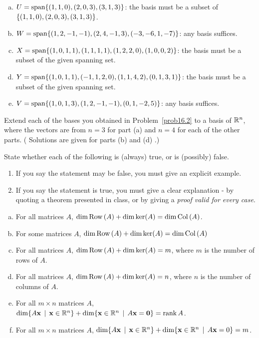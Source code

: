 \begin{prob}
\begin{enumerate}[a)]
\item $U=\textrm{span}\{(1,1,0), (2,0,3), (3,1,3)\}$: the basis must be a subset of $\{(1,1,0), (2,0,3), (3,1,3) \}$.
 
%
\medskip
\item\sov $W=\textrm{span}\{(1,2,-1,-1),(2,4,-1,3),(-3,-6,1,-7)\}$: any basis suffices.
\medskip
%
\item $X=\textrm{span}\{(1,0,1,1),(1,1,1,1),(1,2,2,0),(1,0,0,2) \}$: the basis must be a subset of the given spanning set.
\medskip
% 
\item\sov $Y=\textrm{span}\{(1,0,1,1), (-1,1,2,0), (1,1,4,2), (0,1,3,1)\}$: the basis must be a subset of the given spanning set.
\medskip
%
\item $V=\textrm{span}\{(1,0,1,3),(1,2,-1,-1),( 0,1,-2,5)\}$: any basis suffices.
\medskip
%
\end{enumerate}

\end{prob} \begin{prob} \label{prob16.3} Extend each of the bases you obtained in Problem~\ref{prob16.2} to a basis of $\mathbb{R}^n$, where the vectors are from $n=3$ for part (a) and $n=4$ for each of the other parts. ( Solutions are given for parts (b) \sov and (d) \sov.)

\end{prob} \begin{prob} \label{prob16.4} State whether each of the following is (always) true,
or is (possibly) false.     
   \smallskip    
\begin{enumerate}[$\bullet$]
\item If you say the statement may be false, you    must give an explicit example.   
\item If you say the statement is true, you must give a clear explanation -   by quoting a theorem presented in class, or by giving a {\it proof valid for every  case}. 
\end{enumerate}

\begin{enumerate}[a)]
\medskip
\item For all matrices $A$, $\dim \operatorname{Row\,}(A) + \dim \ker(A)= \dim \operatorname{Col\,}(A)$.
\medskip
%

\item\sov For some matrices $A$, $\dim \operatorname{Row\,}(A)+ \dim \ker(A)=
 \dim \operatorname{Col\,}(A)$
\medskip
%
\item For all matrices $A$, $\dim \operatorname{Row\,}(A)+ \dim \ker(A)= m$, where $m$ is the number of rows of $A$.
\medskip
%
\item\sov For all matrices $A$, $\dim \operatorname{Row\,}(A)+ \dim \ker(A)= n$, where $n$ is the number of columns of $A$.
\medskip
%
\item For all $m\times n$ matrices $A$, $\dim \{A\mathbf{x}\,\mid \, \mathbf{x}\in \mathbb{R}^n \} + \dim\{\mathbf{x} \in \mathbb{R}^n \,\mid \, A\mathbf{x}=\mathbf{0} \}= \operatorname{rank} A$.
\medskip
%
\item\sov For all $m\times n$ matrices $A$, $\dim \{A\mathbf{x}\,\mid \, \mathbf{x}\in \mathbb{R}^n \} + \dim\{\mathbf{x} \in \mathbb{R}^n \,\mid \, A\mathbf{x}=0 \}= m$.
\medskip
%


\end{enumerate}
\end{prob}

